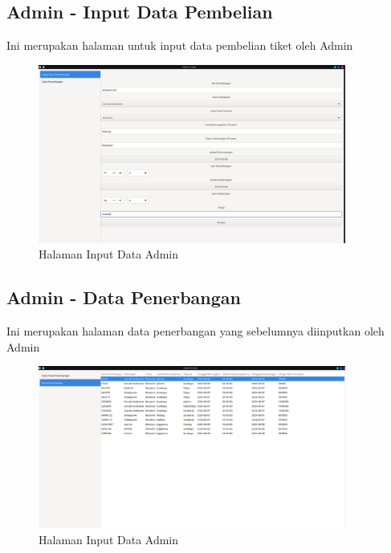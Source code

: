 \documentclass[a4paper,12pt]{article}
\begin{document}
\subsection{Admin - Input Data Pembelian}
Ini merupakan halaman untuk input data pembelian tiket oleh Admin
\begin{figure}[!htbp]
    \centering
    \includegraphics[width=0.9\textwidth]{./Input_data.png}
    \caption{Halaman Input Data Admin}

\end{figure}
\FloatBarrier 

\subsection{Admin - Data Penerbangan}
Ini merupakan halaman data penerbangan yang sebelumnya diinputkan oleh Admin
\begin{figure}[!htbp]
    \centering
    \includegraphics[width=0.9\textwidth]{./Data_penerbangan.png}
    \caption{Halaman Input Data Admin}

\end{figure}
\FloatBarrier 
\end{document}
